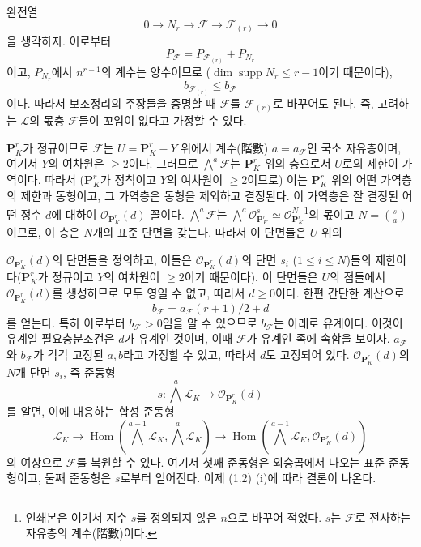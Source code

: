 \documentclass[11pt,twoside,openany]{book}
\numberwithin{equation}{section}
\newcommand{\sourceunit}{front}
\newcommand{\src}[1]{%
  \phantomsection\hypertarget{src:\sourceunit:#1}{}%
  \marginpar{\raggedleft\footnotesize\sffamily #1}%
}
\theoremstyle{plain}
\theoremstyle{definition}
\theoremstyle{remark}
\begin{document}
완전열
\[
0\longrightarrow N_r\longrightarrow\mathcal F
\longrightarrow\mathcal F_{(r)}\longrightarrow0
\]
을 생각하자. 이로부터
\[
P_{\mathcal F}=P_{\mathcal F_{(r)}}+P_{N_r}
\]
이고, $P_{N_r}$에서 $n^{r-1}$의 계수는 양수이므로
($\dim\operatorname{supp}N_r\leq r-1$이기 때문이다),
\[
b_{\mathcal F_{(r)}}\leq b_{\mathcal F}
\]
이다. 따라서 보조정리의 주장들을 증명할 때 $\mathcal F$를
$\mathcal F_{(r)}$로 바꾸어도 된다. 즉, 고려하는 $\mathcal L$의 몫층
$\mathcal F$들이 꼬임이 없다고 가정할 수 있다.

$\mathbf P^r_K$가 정규이므로 $\mathcal F$는
$U=\mathbf P^r_K-Y$ 위에서 계수(階數) $a=a_{\mathcal F}$인 국소
자유층이며, 여기서 $Y$의 여차원은 $\geq2$이다. 그러므로
$\bigwedge^a\mathcal F$는 $\mathbf P^r_K$ 위의 층으로서 $U$로의 제한이
가역이다. 따라서 ($\mathbf P^r_K$가 정칙이고 $Y$의 여차원이
$\geq2$이므로) 이는 $\mathbf P^r_K$ 위의 어떤 가역층의 제한과
동형이고, 그 가역층은 동형을 제외하고 결정된다. 이 가역층은 잘 결정된
어떤 정수 $d$에 대하여 $\mathcal O_{\mathbf P^r_K}(d)$ 꼴이다.
$\bigwedge^a\mathcal F$는
$\bigwedge^a\mathcal O_{\mathbf P^r_K}^{s}\simeq
\mathcal O_{\mathbf P^r_K}^{N}$\footnote{인쇄본은 여기서 지수 $s$를
정의되지 않은 $n$으로 바꾸어 적었다. $s$는 $\mathcal F$로 전사하는
자유층의 계수(階數)이다.}의 몫이고 $N=\binom{s}{a}$이므로, 이 층은
$N$개의 표준 단면을 갖는다. 따라서 이 단면들은 $U$ 위의
\src{257}
$\mathcal O_{\mathbf P^r_K}(d)$의 단면들을 정의하고, 이들은
$\mathcal O_{\mathbf P^r_K}(d)$의 단면 $s_i$ ($1\leq i\leq N$)들의
제한이다($\mathbf P^r_K$가 정규이고 $Y$의 여차원이 $\geq2$이기
때문이다). 이 단면들은 $U$의 점들에서
$\mathcal O_{\mathbf P^r_K}(d)$를 생성하므로 모두 영일 수 없고, 따라서
$d\geq0$이다. 한편 간단한 계산으로
\[
b_{\mathcal F}=a_{\mathcal F}(r+1)/2+d
\]
를 얻는다. 특히 이로부터 $b_{\mathcal F}>0$임을 알 수 있으므로
$b_{\mathcal F}$는 아래로 유계이다. 이것이 유계일 필요충분조건은 $d$가
유계인 것이며, 이때 $\mathcal F$가 유계인 족에 속함을 보이자.
$a_{\mathcal F}$와 $b_{\mathcal F}$가 각각 고정된 $a,b$라고 가정할 수
있고, 따라서 $d$도 고정되어 있다.
$\mathcal O_{\mathbf P^r_K}(d)$의 $N$개 단면 $s_i$, 즉 준동형
\[
s:\bigwedge^a\mathcal L_K\longrightarrow\mathcal O_{\mathbf P^r_K}(d)
\]
를 알면, 이에 대응하는 합성 준동형
\[
\mathcal L_K\longrightarrow
\operatorname{Hom}\!\left(\bigwedge^{a-1}\mathcal L_K,
\bigwedge^a\mathcal L_K\right)\longrightarrow
\operatorname{Hom}\!\left(\bigwedge^{a-1}\mathcal L_K,
\mathcal O_{\mathbf P^r_K}(d)\right)
\]
의 여상으로 $\mathcal F$를 복원할 수 있다. 여기서 첫째 준동형은
외승곱에서 나오는 표준 준동형이고, 둘째 준동형은 $s$로부터 얻어진다.
이제 (1.2) (i)에 따라 결론이 나온다.
\end{document}
